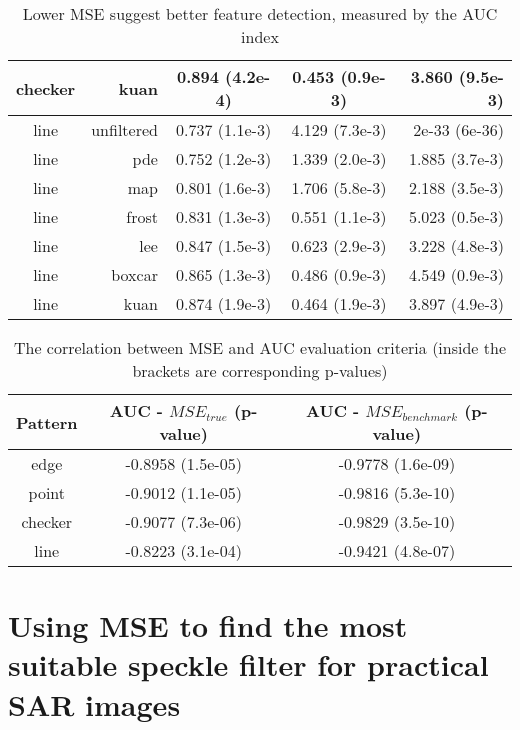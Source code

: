 \documentclass[journal]{IEEEtran}
\begin{document}
\begin{table}
\begin{tabular}{c|r|c|c|r}
 checker  &  kuan  &  0.894 (4.2e-4)  &  0.453 (0.9e-3)  &  3.860 (9.5e-3)\\
\hline
 line  &  unfiltered  &  0.737 (1.1e-3)  &  4.129 (7.3e-3)  &  2e-33 (6e-36)\\
 line  &  pde  &  0.752 (1.2e-3)  &  1.339 (2.0e-3)  &  1.885 (3.7e-3)\\
 line  &  map  &  0.801 (1.6e-3)  &  1.706 (5.8e-3)  &  2.188 (3.5e-3)\\
 line  &  frost  &  0.831 (1.3e-3)  &  0.551 (1.1e-3)  &  5.023 (0.5e-3)\\
 line  &  lee  &  0.847 (1.5e-3)  &  0.623 (2.9e-3)  &  3.228 (4.8e-3)\\
 line  &  boxcar  &  0.865 (1.3e-3)  &  0.486 (0.9e-3)  &  4.549 (0.9e-3)\\
 line  &  kuan  &  0.874 (1.9e-3)  &  0.464 (1.9e-3)  &  3.897 (4.9e-3)\\
\hline
\end{tabular}

\caption{Lower MSE suggest better feature detection, measured by the AUC index}
\label{tab:mse_auc_in_log_domain}
\end{table}

\begin{table}
\centering
\begin{tabular}{c|c|c}
Pattern  & AUC - $MSE_{true}$ (p-value) & AUC - $MSE_{benchmark}$ (p-value) \\
\hline
edge & -0.8958 (1.5e-05) &   -0.9778  (1.6e-09) \\
point &     -0.9012   (1.1e-05)   &    -0.9816        (5.3e-10) \\
checker &   -0.9077     (7.3e-06)  &  -0.9829       (3.5e-10) \\
line &      -0.8223     (3.1e-04)  &   -0.9421       (4.8e-07) \\
\hline
\end{tabular}

\caption{The correlation between MSE and AUC evaluation criteria (inside the brackets are corresponding p-values)}
\label{tab:mse_auc_corr_coeff}
\end{table}

\section{Using MSE to find the most suitable speckle filter for practical SAR images}
\label{sec:practical_conjecture}
\end{document}

